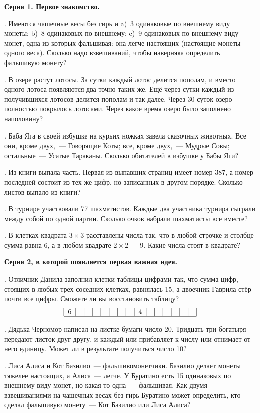 \centerline{\bf Серия 1. Первое знакомство.}

. Имеются чашечные весы без гирь и a)~3 одинаковые по внешнему
виду монеты;  b)~8 одинаковых по внешнему;  c)~9 одинаковых по внешнему
виду монет, одна из которых фальшивая: она легче настоящих
(настоящие монеты одного веса). Сколько надо взвешиваний, 
чтобы наверняка определить фальшивую монету? 

. В озере растут лотосы. За сутки каждый лотос делится пополам, 
и вместо одного лотоса появляются два точно таких же. Ещё через сутки каждый
из получившихся лотосов делится пополам и так далее. Через 30 суток
озеро полностью покрылось лотосами. Через какое время озеро было
заполнено наполовину?

. Баба Яга в своей избушке на курьих ножках завела сказочных
животных. Все они, кроме двух,~--- Говорящие Коты; все, кроме двух,~---
Мудрые Совы; остальные~--- Усатые Тараканы. Сколько обитателей
в избушке у Бабы Яги?

.  Из книги выпала часть. Первая из выпавших страниц имеет
номер 387, а номер последней состоит из тех же цифр, но записанных
в другом порядке. Сколько листов выпало из книги?

. В турнире участвовали 77 шахматистов. Каждые два участника 
турнира сыграли между собой по одной партии.  Сколько
очков набрали шахматисты все вместе?

. В клетках квадрата $3 \times 3$ расставлены числа так, что в любой
строчке и столбце сумма равна 6, а в любом квадрате $2 \times 2$ --- 9.
Какие числа стоят в квадрате?

\centerline{\bf Серия 2, в которой появляется первая важная идея.}

. Отличник Данила заполнил клетки таблицы цифрами так, что
сумма цифр, стоящих в любых трех соседних клетках, равнялась 15,
а двоечник Гаврила стёр почти все цифры. Сможете ли вы восстановить
таблицу?
$$
\begin{tabular}{|c|c|c|c|c|c|c|c|c|c|c|c|c|c|c|}%
\hline
6& & & & & & & &4& & & & & & \\
\hline
\end{tabular}
$$

. Дядька Черномор написал на листке бумаги число 20. Тридцать
три богатыря передают листок друг другу, и каждый или прибавляет
к числу или отнимает от него единицу. Может ли в результате 
получиться число 10?

. Лиса Алиса и Кот Базилио~--- фальшивомонетчики. Базилио
делает монеты тяжелее настоящих, а Алиса~--- легче. У Буратино есть
15 одинаковых по внешнему виду монет, но какая-то одна~--- фальшивая. 
Как двумя взвешиваниями на чашечных весах без гирь Буратино
может определить, кто сделал фальшивую монету~--- Кот Базилио или
Лиса Алиса?

